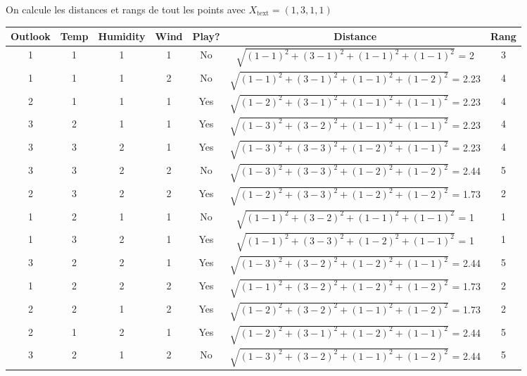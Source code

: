 \documentclass{article}
\begin{document}
On calcule les distances et rangs de tout les points avec $X_{\text{text}} = (1,3,1,1) $
\begin{table}[h]
\centering

\renewcommand{\arraystretch}{1.25} 
\setlength{\tabcolsep}{8pt}      

\begin{tabular}{|c|c|c|c|c|c|c|} 

\hline
\textbf{Outlook}  & \textbf{Temp} & \textbf{Humidity} & \textbf{Wind} & \textbf{Play?} & \textbf{Distance} & \textbf{Rang} \\ \hline
1 & 1& 1 & 1 & No &  {\scriptsize $\sqrt{(1-1)^2 + (3-1)^2 + (1-1)^2 + (1-1)^2 }$ = 2 } & 3\\ \hline
1 &1 &1 &2& No &  {\scriptsize $\sqrt{(1-1)^2 + (3-1)^2 + (1-1)^2 + (1-2)^2 }$ = 2.23 }& 4 \\ \hline
2 &1 &1 &1 &Yes &  {\scriptsize $\sqrt{(1-2)^2 + (3-1)^2 + (1-1)^2 + (1-1)^2 }$ = 2.23 } & 4 \\ \hline
3 &2 &1 &1 &Yes &  {\scriptsize $\sqrt{(1-3)^2 + (3-2)^2 + (1-1)^2 + (1-1)^2 }$ = 2.23 } & 4 \\ \hline
3 &3 &2 &1 &Yes &  {\scriptsize $\sqrt{(1-3)^2 + (3-3)^2 + (1-2)^2 + (1-1)^2 }$ = 2.23 } & 4 \\ \hline
3 &3 &2 &2 &No &  {\scriptsize $\sqrt{(1-3)^2 + (3-3)^2 + (1-2)^2 + (1-2)^2 }$ = 2.44 } & 5 \\ \hline
 2 &3 &2 &2 &Yes &  {\scriptsize $\sqrt{(1-2)^2 + (3-3)^2 + (1-2)^2 + (1-2)^2 }$ = 1.73 } & 2 \\ \hline
 1 &2 &1 &1 &No &  {\scriptsize $\sqrt{(1-1)^2 + (3-2)^2 + (1-1)^2 + (1-1)^2 }$ = 1 } & 1 \\ \hline
 1 &3 &2 &1 &Yes &  {\scriptsize $\sqrt{(1-1)^2 + (3-3)^2 + (1-2)^2 + (1-1)^2 }$ = 1 } & 1 \\ \hline
 3 &2 &2 &1 &Yes &  {\scriptsize $\sqrt{(1-3)^2 + (3-2)^2 + (1-2)^2 + (1-1)^2 }$ = 2.44 } & 5 \\ \hline
 1 &2 &2 &2 &Yes &  {\scriptsize $\sqrt{(1-1)^2 + (3-2)^2 + (1-2)^2 + (1-2)^2 }$ = 1.73 } & 2\\ \hline
 2 &2 &1 &2 &Yes &  {\scriptsize $\sqrt{(1-2)^2 + (3-2)^2 + (1-1)^2 + (1-2)^2 }$ = 1.73 } & 2 \\ \hline
 2 & 1& 2 &1& Yes &  {\scriptsize $\sqrt{(1-2)^2 + (3-1)^2 + (1-2)^2 + (1-1)^2 }$ = 2.44 } &5 \\ \hline
 3 &2 &1& 2& No  &  {\scriptsize $\sqrt{(1-3)^2 + (3-2)^2 + (1-1)^2 + (1-2)^2 }$ = 2.44 } &5\\ \hline
\end{tabular}
\end{table}
\end{document}
